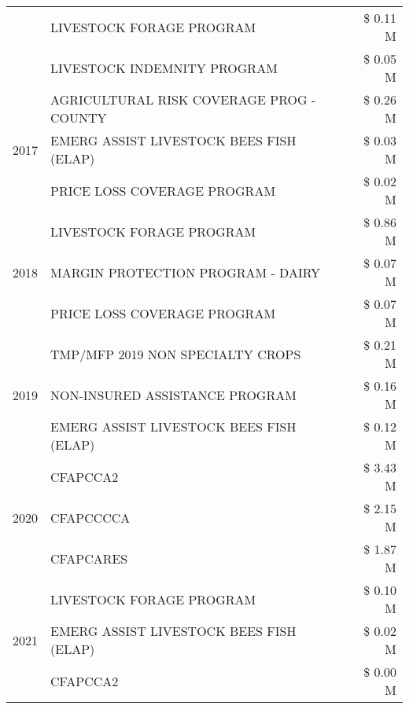 \begin{tabular}{llr}
 & LIVESTOCK FORAGE PROGRAM & \$ 0.11 M \\
 & LIVESTOCK INDEMNITY PROGRAM & \$ 0.05 M \\
\cline{1-3}
\multirow[t]{3}{*}{2017} & AGRICULTURAL RISK COVERAGE PROG - COUNTY & \$ 0.26 M \\
 & EMERG ASSIST LIVESTOCK BEES FISH (ELAP) & \$ 0.03 M \\
 & PRICE LOSS COVERAGE PROGRAM & \$ 0.02 M \\
\cline{1-3}
\multirow[t]{3}{*}{2018} & LIVESTOCK FORAGE PROGRAM & \$ 0.86 M \\
 & MARGIN PROTECTION PROGRAM - DAIRY & \$ 0.07 M \\
 & PRICE LOSS COVERAGE PROGRAM & \$ 0.07 M \\
\cline{1-3}
\multirow[t]{3}{*}{2019} & TMP/MFP 2019 NON SPECIALTY CROPS & \$ 0.21 M \\
 & NON-INSURED ASSISTANCE PROGRAM & \$ 0.16 M \\
 & EMERG ASSIST LIVESTOCK BEES FISH (ELAP) & \$ 0.12 M \\
\cline{1-3}
\multirow[t]{3}{*}{2020} & CFAPCCA2 & \$ 3.43 M \\
 & CFAPCCCCA & \$ 2.15 M \\
 & CFAPCARES & \$ 1.87 M \\
\cline{1-3}
\multirow[t]{3}{*}{2021} & LIVESTOCK FORAGE PROGRAM & \$ 0.10 M \\
 & EMERG ASSIST LIVESTOCK BEES FISH (ELAP) & \$ 0.02 M \\
 & CFAPCCA2 & \$ 0.00 M \\
\cline{1-3}
\bottomrule
\end{tabular}

